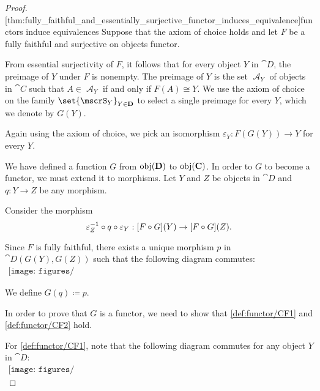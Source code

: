 \begin{proof}
  [thm:fully_faithful_and_essentially_surjective_functor_induces_equivalence]{functors induce equivalences} Suppose that the axiom of choice holds and let \( F \) be a fully faithful and surjective on objects functor.

  From essential surjectivity of \( F \), it follows that for every object \( Y \) in \( \cat{D} \), the preimage of \( Y \) under \( F \) is nonempty. The preimage of \( Y \) is the set \( \mscrA_Y \) of objects in \( \cat{C} \) such that \( A \in \mscrA_Y \) if and only if \( F(A) \cong Y \). We use the axiom of choice on the family \( \set{ \mscrS_Y }_{Y \in \cat{D}} \) to select a single preimage for every \( Y \), which we denote by \( G(Y) \).

  Again using the axiom of choice, we pick an isomorphism \( \varepsilon_Y: F(G(Y)) \to Y \) for every \( Y \).

  We have defined a function \( G \) from \( \operatorname{obj}(\operatorname{\mathbf{D}}) \) to \( \operatorname{obj}(\operatorname{\mathbf{C}}) \). In order to \( G \) to become a functor, we must extend it to morphisms. Let \( Y \) and \( Z \) be objects in \( \cat{D} \) and \( q: Y \to Z \) be any morphism.

  Consider the morphism
  \begin{equation*}
    \varepsilon_Z^{-1} \bincirc q \bincirc \varepsilon_Y: [F \bincirc G](Y) \to [F \bincirc G](Z).
  \end{equation*}

  Since \( F \) is fully faithful, there exists a unique morphism \( p \) in \( \cat{D}(G(Y), G(Z)) \) such that the following diagram commutes:
  \begin{equation}\label{eq:thm__fully_faithful_and_essentially_surjective_functor_induces_equivalence/inverse_morphism_definition}
    \begin{aligned}
      \texttt{[image: figures/thm\_\_fully\_faithful\_and\_essentially\_surjective\_functor\_induces\_equivalence.pdf]}
    \end{aligned}
  \end{equation}

  We define \( G(q) \coloneqq p \).

  In order to prove that \( G \) is a functor, we need to show that \ref{def:functor/CF1} and \ref{def:functor/CF2} hold.

  For \ref{def:functor/CF1}, note that the following diagram commutes for any object \( Y \) in \( \cat{D} \):
  \begin{equation}\label{eq:thm__fully_faithful_and_essentially_surjective_functor_induces_equivalence/identity}
    \begin{aligned}
      \texttt{[image: figures/thm\_\_fully\_faithful\_and\_essentially\_surjective\_functor\_induces\_equivalence.pdf]}
    \end{aligned}
  \end{equation}


\end{proof}
